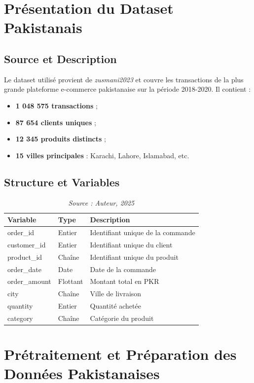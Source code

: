 \documentclass[a4paper,12pt]{article}
\begin{document}
\section{Présentation du Dataset Pakistanais}
\subsection{Source et Description}
Le dataset utilisé provient de \textit{zusmani2023} et couvre les transactions de la plus grande plateforme e-commerce pakistanaise sur la période 2018-2020. Il contient :
\begin{itemize}
    \item \textbf{1 048 575 transactions} ;
    \item \textbf{87 654 clients uniques} ;
    \item \textbf{12 345 produits distincts} ;
    \item \textbf{15 villes principales} : Karachi, Lahore, Islamabad, etc.
\end{itemize}

\subsection{Structure et Variables}
\begin{table}[H]
\centering
\begin{tabular}{|l|l|p{7cm}|}
\hline
\textbf{Variable} & \textbf{Type} & \textbf{Description} \\
\hline
order\_id & Entier & Identifiant unique de la commande \\
\hline
customer\_id & Entier & Identifiant unique du client \\
\hline
product\_id & Chaîne & Identifiant unique du produit \\
\hline
order\_date & Date & Date de la commande \\
\hline
order\_amount & Flottant & Montant total en PKR \\
\hline
city & Chaîne & Ville de livraison \\
\hline
quantity & Entier & Quantité achetée \\
\hline
category & Chaîne & Catégorie du produit \\
\hline
\end{tabular}
\caption{Structure du dataset pakistanais original}
\caption*{\textit{Source : Auteur, 2025}}

\label{tab:dataset_structure}
\end{table}
\newpage
\section{Prétraitement et Préparation des Données Pakistanaises}
\end{document}
